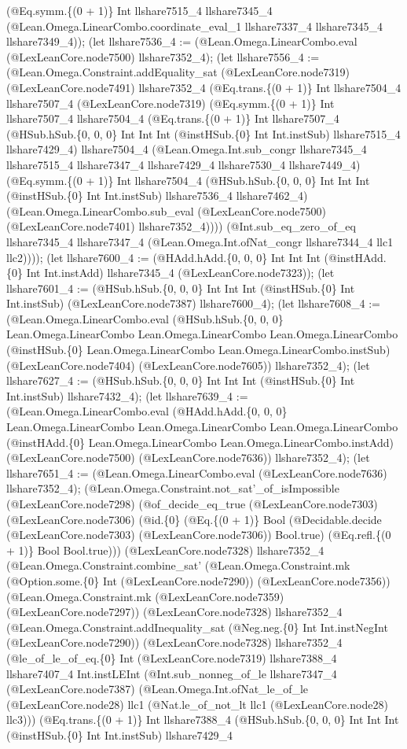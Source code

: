 \documentclass[11pt]{article}
\begin{document}
(@Eq.symm.\{(0 + 1)\} Int llshare7515\_4 llshare7345\_4 (@Lean.Omega.LinearCombo.coordinate\_eval\_1 llshare7337\_4 llshare7345\_4 llshare7349\_4)); (let llshare7536\_4 := (@Lean.Omega.LinearCombo.eval (@LexLeanCore.node7500) llshare7352\_4); (let llshare7556\_4 := (@Lean.Omega.Constraint.addEquality\_sat (@LexLeanCore.node7319) (@LexLeanCore.node7491) llshare7352\_4 (@Eq.trans.\{(0 + 1)\} Int llshare7504\_4 llshare7507\_4 (@LexLeanCore.node7319) (@Eq.symm.\{(0 + 1)\} Int llshare7507\_4 llshare7504\_4 (@Eq.trans.\{(0 + 1)\} Int llshare7507\_4 (@HSub.hSub.\{0, 0, 0\} Int Int Int (@instHSub.\{0\} Int Int.instSub) llshare7515\_4 llshare7429\_4) llshare7504\_4 (@Lean.Omega.Int.sub\_congr llshare7345\_4 llshare7515\_4 llshare7347\_4 llshare7429\_4 llshare7530\_4 llshare7449\_4) (@Eq.symm.\{(0 + 1)\} Int llshare7504\_4 (@HSub.hSub.\{0, 0, 0\} Int Int Int (@instHSub.\{0\} Int Int.instSub) llshare7536\_4 llshare7462\_4) (@Lean.Omega.LinearCombo.sub\_eval (@LexLeanCore.node7500) (@LexLeanCore.node7401) llshare7352\_4)))) (@Int.sub\_eq\_zero\_of\_eq llshare7345\_4 llshare7347\_4 (@Lean.Omega.Int.ofNat\_congr llshare7344\_4 llc1 llc2)))); (let llshare7600\_4 := (@HAdd.hAdd.\{0, 0, 0\} Int Int Int (@instHAdd.\{0\} Int Int.instAdd) llshare7345\_4 (@LexLeanCore.node7323)); (let llshare7601\_4 := (@HSub.hSub.\{0, 0, 0\} Int Int Int (@instHSub.\{0\} Int Int.instSub) (@LexLeanCore.node7387) llshare7600\_4); (let llshare7608\_4 := (@Lean.Omega.LinearCombo.eval (@HSub.hSub.\{0, 0, 0\} Lean.Omega.LinearCombo Lean.Omega.LinearCombo Lean.Omega.LinearCombo (@instHSub.\{0\} Lean.Omega.LinearCombo Lean.Omega.LinearCombo.instSub) (@LexLeanCore.node7404) (@LexLeanCore.node7605)) llshare7352\_4); (let llshare7627\_4 := (@HSub.hSub.\{0, 0, 0\} Int Int Int (@instHSub.\{0\} Int Int.instSub) llshare7432\_4); (let llshare7639\_4 := (@Lean.Omega.LinearCombo.eval (@HAdd.hAdd.\{0, 0, 0\} Lean.Omega.LinearCombo Lean.Omega.LinearCombo Lean.Omega.LinearCombo (@instHAdd.\{0\} Lean.Omega.LinearCombo Lean.Omega.LinearCombo.instAdd) (@LexLeanCore.node7500) (@LexLeanCore.node7636)) llshare7352\_4); (let llshare7651\_4 := (@Lean.Omega.LinearCombo.eval (@LexLeanCore.node7636) llshare7352\_4); (@Lean.Omega.Constraint.not\_sat'\_of\_isImpossible (@LexLeanCore.node7298) (@of\_decide\_eq\_true (@LexLeanCore.node7303) (@LexLeanCore.node7306) (@id.\{0\} (@Eq.\{(0 + 1)\} Bool (@Decidable.decide (@LexLeanCore.node7303) (@LexLeanCore.node7306)) Bool.true) (@Eq.refl.\{(0 + 1)\} Bool Bool.true))) (@LexLeanCore.node7328) llshare7352\_4 (@Lean.Omega.Constraint.combine\_sat' (@Lean.Omega.Constraint.mk (@Option.some.\{0\} Int (@LexLeanCore.node7290)) (@LexLeanCore.node7356)) (@Lean.Omega.Constraint.mk (@LexLeanCore.node7359) (@LexLeanCore.node7297)) (@LexLeanCore.node7328) llshare7352\_4 (@Lean.Omega.Constraint.addInequality\_sat (@Neg.neg.\{0\} Int Int.instNegInt (@LexLeanCore.node7290)) (@LexLeanCore.node7328) llshare7352\_4 (@le\_of\_le\_of\_eq.\{0\} Int (@LexLeanCore.node7319) llshare7388\_4 llshare7407\_4 Int.instLEInt (@Int.sub\_nonneg\_of\_le llshare7347\_4 (@LexLeanCore.node7387) (@Lean.Omega.Int.ofNat\_le\_of\_le (@LexLeanCore.node28) llc1 (@Nat.le\_of\_not\_lt llc1 (@LexLeanCore.node28) llc3))) (@Eq.trans.\{(0 + 1)\} Int llshare7388\_4 (@HSub.hSub.\{0, 0, 0\} Int Int Int (@instHSub.\{0\} Int Int.instSub) llshare7429\_4 
\end{document}
